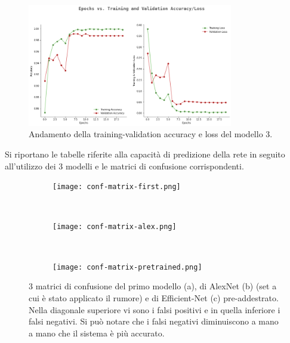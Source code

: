    \begin{figure}[hb!]
      \centering
      \includegraphics[width=0.8\textwidth]{Figures/history-model-pretrained.png}
      \caption{\small{Andamento della training-validation accuracy e loss del modello 3.} %
      } %
      \label{fi:dcalc}
    \end{figure}
    Si riportano le tabelle riferite alla capacità di predizione della rete in seguito 
    all'utilizzo dei 3 modelli e le matrici di 
    confusione corrispondenti.
    \begin{figure}[H]
      \begin{subfigure}{1\textwidth}
        \centering
        \texttt{[image: conf-matrix-first.png]}
        \caption{}
        \label{fig:snap1}
      \end{subfigure}\\
      \begin{subfigure}{1\textwidth}
        \centering
        \texttt{[image: conf-matrix-alex.png]}
        \caption{}
        \label{fig:snap2}
      \end{subfigure}\\
      \begin{subfigure}{0.93\textwidth}
        \centering
        
        \texttt{[image: conf-matrix-pretrained.png]}
        \caption{}
        \label{fig:snap3}
      \end{subfigure}
      \caption{3 matrici di confusione del primo modello (a), di AlexNet (b) (set a cui è stato applicato il rumore) e di Efficient-Net (c) pre-addestrato. Nella diagonale superiore vi sono i falsi positivi e in quella inferiore i falsi negativi. Si può notare che i falsi negativi diminuiscono a mano a mano che il sistema è più accurato.}
      
      \label{fig:fig}
      \end{figure} 
